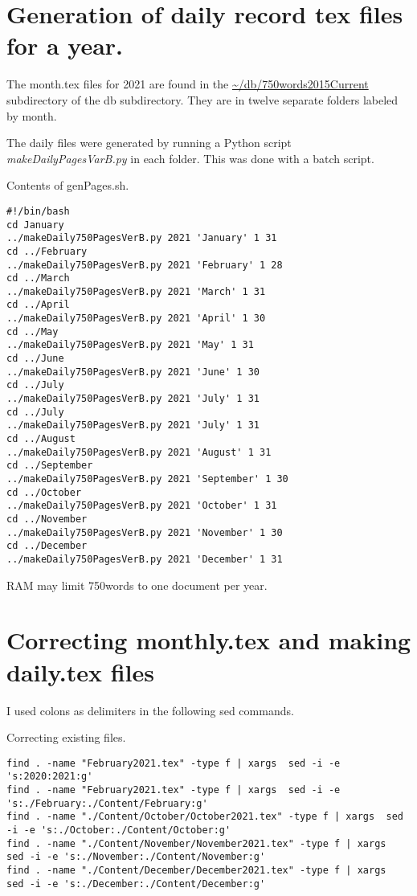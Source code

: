 \section*{Generation of daily record tex files for a year.}
The month.tex files for 2021 are found in the \url{~/db/750words2015Current} subdirectory of the db subdirectory.
They are in twelve separate folders labeled by month.

The daily files were generated by running a Python script \emph{makeDailyPagesVarB.py} in each folder.
This was done with a batch script. 

\begin{code}{}
\label{lst750wordsMakingWords}
\caption{Contents of genPages.sh.}
\begin{verbatim}
#!/bin/bash
cd January
../makeDaily750PagesVerB.py 2021 'January' 1 31
cd ../February
../makeDaily750PagesVerB.py 2021 'February' 1 28
cd ../March
../makeDaily750PagesVerB.py 2021 'March' 1 31
cd ../April
../makeDaily750PagesVerB.py 2021 'April' 1 30
cd ../May
../makeDaily750PagesVerB.py 2021 'May' 1 31
cd ../June
../makeDaily750PagesVerB.py 2021 'June' 1 30
cd ../July
../makeDaily750PagesVerB.py 2021 'July' 1 31
cd ../July
../makeDaily750PagesVerB.py 2021 'July' 1 31
cd ../August
../makeDaily750PagesVerB.py 2021 'August' 1 31
cd ../September
../makeDaily750PagesVerB.py 2021 'September' 1 30
cd ../October
../makeDaily750PagesVerB.py 2021 'October' 1 31
cd ../November
../makeDaily750PagesVerB.py 2021 'November' 1 30
cd ../December
../makeDaily750PagesVerB.py 2021 'December' 1 31
\end{verbatim}
\end{code}


RAM may limit 750words to one document per year.


\section*{Correcting monthly.tex and making daily.tex files}

I used colons as delimiters in the following sed commands. 

\begin{code}{}
\label{lst:750words}
\caption{Correcting existing files.}
\begin{verbatim}
find . -name "February2021.tex" -type f | xargs  sed -i -e 's:2020:2021:g'
find . -name "February2021.tex" -type f | xargs  sed -i -e 's:./February:./Content/February:g'
find . -name "./Content/October/October2021.tex" -type f | xargs  sed -i -e 's:./October:./Content/October:g'
find . -name "./Content/November/November2021.tex" -type f | xargs  sed -i -e 's:./November:./Content/November:g'
find . -name "./Content/December/December2021.tex" -type f | xargs  sed -i -e 's:./December:./Content/December:g'
\end{verbatim}
\end{code}